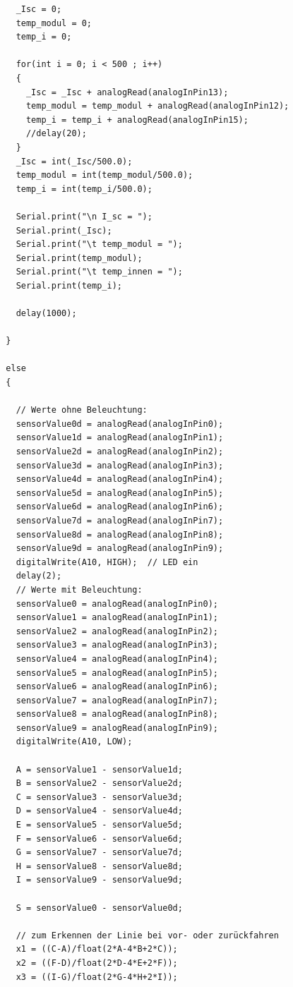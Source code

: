 \documentclass[a4paper,bibtotoc,oneside]{scrbook}
\begin{document}
\begin{appendix}
\begin{verbatim}
    _Isc = 0;
    temp_modul = 0;
    temp_i = 0;

    for(int i = 0; i < 500 ; i++)
    {
      _Isc = _Isc + analogRead(analogInPin13);  
      temp_modul = temp_modul + analogRead(analogInPin12); 
      temp_i = temp_i + analogRead(analogInPin15);  
      //delay(20);
    }
    _Isc = int(_Isc/500.0);
    temp_modul = int(temp_modul/500.0);
    temp_i = int(temp_i/500.0);

    Serial.print("\n I_sc = ");   
    Serial.print(_Isc);
    Serial.print("\t temp_modul = ");   
    Serial.print(temp_modul);
    Serial.print("\t temp_innen = ");   
    Serial.print(temp_i);

    delay(1000); 

  }

  else
  {

    // Werte ohne Beleuchtung:
    sensorValue0d = analogRead(analogInPin0);   
    sensorValue1d = analogRead(analogInPin1);  
    sensorValue2d = analogRead(analogInPin2);  
    sensorValue3d = analogRead(analogInPin3);  
    sensorValue4d = analogRead(analogInPin4);  
    sensorValue5d = analogRead(analogInPin5);  
    sensorValue6d = analogRead(analogInPin6);  
    sensorValue7d = analogRead(analogInPin7);  
    sensorValue8d = analogRead(analogInPin8);  
    sensorValue9d = analogRead(analogInPin9);  
    digitalWrite(A10, HIGH);  // LED ein
    delay(2); 
    // Werte mit Beleuchtung:
    sensorValue0 = analogRead(analogInPin0);   
    sensorValue1 = analogRead(analogInPin1);  
    sensorValue2 = analogRead(analogInPin2);  
    sensorValue3 = analogRead(analogInPin3);  
    sensorValue4 = analogRead(analogInPin4);  
    sensorValue5 = analogRead(analogInPin5);  
    sensorValue6 = analogRead(analogInPin6);  
    sensorValue7 = analogRead(analogInPin7);  
    sensorValue8 = analogRead(analogInPin8);  
    sensorValue9 = analogRead(analogInPin9);  
    digitalWrite(A10, LOW);

    A = sensorValue1 - sensorValue1d;
    B = sensorValue2 - sensorValue2d;
    C = sensorValue3 - sensorValue3d;
    D = sensorValue4 - sensorValue4d;
    E = sensorValue5 - sensorValue5d;
    F = sensorValue6 - sensorValue6d;
    G = sensorValue7 - sensorValue7d;
    H = sensorValue8 - sensorValue8d;
    I = sensorValue9 - sensorValue9d;

    S = sensorValue0 - sensorValue0d;

    // zum Erkennen der Linie bei vor- oder zurückfahren 
    x1 = ((C-A)/float(2*A-4*B+2*C));
    x2 = ((F-D)/float(2*D-4*E+2*F));
    x3 = ((I-G)/float(2*G-4*H+2*I));


\end{verbatim}
\end{appendix}
\end{document}
